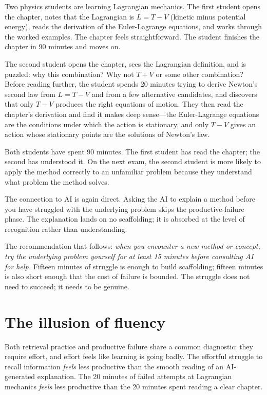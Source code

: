 \documentclass[11pt]{book}
\begin{document}
\begin{example}
Two physics students are learning Lagrangian mechanics. The first student opens the chapter, notes that the Lagrangian is $L = T - V$ (kinetic minus potential energy), reads the derivation of the Euler-Lagrange equations, and works through the worked examples. The chapter feels straightforward. The student finishes the chapter in 90 minutes and moves on.

The second student opens the chapter, sees the Lagrangian definition, and is puzzled: why this combination? Why not $T + V$ or some other combination? Before reading further, the student spends 20 minutes trying to derive Newton's second law from $L = T - V$ and from a few alternative candidates, and discovers that only $T - V$ produces the right equations of motion. They then read the chapter's derivation and find it makes deep sense---the Euler-Lagrange equations are the conditions under which the action is stationary, and only $T - V$ gives an action whose stationary points are the solutions of Newton's law.

Both students have spent 90 minutes. The first student has read the chapter; the second has understood it. On the next exam, the second student is more likely to apply the method correctly to an unfamiliar problem because they understand what problem the method solves.
\end{example}

The connection to AI is again direct. Asking the AI to explain a method before you have struggled with the underlying problem skips the productive-failure phase. The explanation lands on no scaffolding; it is absorbed at the level of recognition rather than understanding.

The recommendation that follows: \emph{when you encounter a new method or concept, try the underlying problem yourself for at least 15 minutes before consulting AI for help.} Fifteen minutes of struggle is enough to build scaffolding; fifteen minutes is also short enough that the cost of failure is bounded. The struggle does not need to succeed; it needs to be genuine.

\section{The illusion of fluency}

Both retrieval practice and productive failure share a common diagnostic: they require effort, and effort feels like learning is going badly. The effortful struggle to recall information \emph{feels} less productive than the smooth reading of an AI-generated explanation. The 20 minutes of failed attempts at Lagrangian mechanics \emph{feels} less productive than the 20 minutes spent reading a clear chapter.
\end{document}
